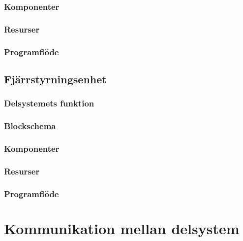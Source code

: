\documentclass{article}
\begin{document}
\subsubsection{Komponenter}

\subsubsection{Resurser}

\subsubsection{Programflöde}

\clearpage

\subsection{Fjärrstyrningsenhet}

\subsubsection{Delsystemets funktion}

\subsubsection{Blockschema}

\subsubsection{Komponenter}

\subsubsection{Resurser}

\subsubsection{Programflöde}

\clearpage

\section{Kommunikation mellan delsystem}
\end{document}
